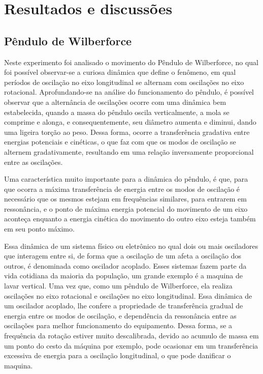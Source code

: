 \section{Resultados e discussões}
\subsection{Pêndulo de Wilberforce}
Neste experimento foi analisado o movimento do Pêndulo de Wilberforce, no qual foi possível observar-se a curiosa dinâmica que define o fenômeno,
em qual períodos de oscilação no eixo longitudinal se alternam com oscilações no eixo rotacional. Aprofundando-se na análise 
do funcionamento do pêndulo, é possível observar que a alternância de oscilações ocorre com uma dinâmica bem estabelecida, 
quando a massa do pêndulo oscila verticalmente, a mola se comprime e alonga, e consequentemente, seu diâmetro aumenta e diminui,
dando uma ligeira torção ao peso. Dessa forma, ocorre a transferência gradativa entre energias potenciais e cinéticas, o que
faz com que os modos de oscilação se alternem gradativamente, resultando em uma relação inversamente proporcional entre as oscilações.

Uma característica muito importante para a dinâmica do pêndulo, é que, para que ocorra a máxima transferência de energia entre os modos
de oscilação é necessário que os mesmos estejam em frequências similares, para entrarem em ressonância, e o ponto de máxima energia potencial
do movimento de um eixo aconteça enquanto a energia cinética do movimento do outro eixo esteja também em seu ponto máximo.

Essa dinâmica de um sistema físico ou eletrônico no qual dois ou mais osciladores que interagem entre si, de forma que a oscilação de 
um afeta a oscilação dos outros, é denominada como oscilador acoplado. Esses sistemas fazem parte da vida cotidiana da maioria da 
população, um grande exemplo é a maquina de lavar vertical. Uma vez que, como um pêndulo de Wilberforce, ela realiza oscilações no 
eixo rotacional e oscilações no eixo longitudinal. Essa dinâmica de um oscilador acoplado, lhe confere a propriedade de transferência 
gradual de energia entre os modos de oscilação, e dependência da ressonância entre as oscilações para melhor funcionamento do equipamento.
Dessa forma, se a frequência da rotação estiver muito descalibrada, devido ao acumulo de massa em um ponto do cesto da máquina por exemplo,
 pode ocasionar em um transferência excessiva de energia para a oscilação longitudinal, o que pode danificar o maquina.

  